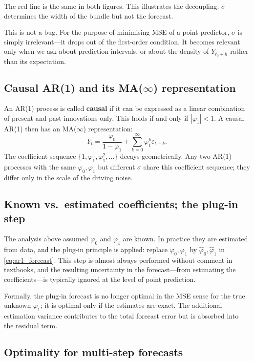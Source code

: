 \documentclass[a4paper,oneside,12pt]{extarticle}
\theoremstyle{plain}
\theoremstyle{definition}
\theoremstyle{remark}
\newcommand*{\ve}{\varepsilon}
\begin{document}
The red line is the same in both figures. This illustrates the
decoupling: $\sigma$ determines the width of the bundle but not the
forecast.

This is not a bug. For the purpose of minimising MSE of a point predictor,
$\sigma$ is simply irrelevant---it drops out of the first-order condition.
It becomes relevant only when we ask about prediction intervals, or about
the density of $Y_{t_0+h}$ rather than its expectation.

\subsection{Causal AR(1) and its MA($\infty$) representation}

An AR(1) process is called \textbf{causal} if it can be expressed as a
linear combination of present and past innovations only.
This holds if and only if $|\varphi_1| < 1$.
A causal AR(1) then has an MA($\infty$) representation:
\[
  Y_t = \frac{\varphi_0}{1-\varphi_1} + \sum_{k=0}^{\infty} \varphi_1^k \ve_{t-k}.
\]
The coefficient sequence $\{1, \varphi_1, \varphi_1^2, \ldots\}$ decays
geometrically. Any two AR(1) processes with the same $\varphi_0, \varphi_1$
but different $\sigma$ share this coefficient sequence; they differ only in
the scale of the driving noise.

\subsection{Known vs.\ estimated coefficients; the plug-in step}

The analysis above assumed $\varphi_0$ and $\varphi_1$ are known. In
practice they are estimated from data, and the plug-in principle is
applied: replace $\varphi_0, \varphi_1$ by $\hat\varphi_0, \hat\varphi_1$
in \eqref{eq:ar1_forecast}. This step is almost always performed without
comment in textbooks, and the resulting uncertainty in the forecast---from
estimating the coefficients---is typically ignored at the level of point
prediction.

Formally, the plug-in forecast is no longer optimal in the MSE sense for
the true unknown $\varphi_1$; it is optimal only if the estimates are
exact. The additional estimation variance contributes to the total forecast
error but is absorbed into the residual term.

\subsection{Optimality for multi-step forecasts}
\end{document}
